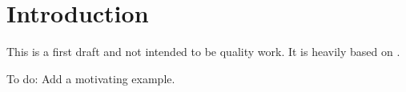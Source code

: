 \section{Introduction}

This is a first draft and not intended to be quality work. It is heavily based on \cite{polterovich}.

To do: Add a motivating example.